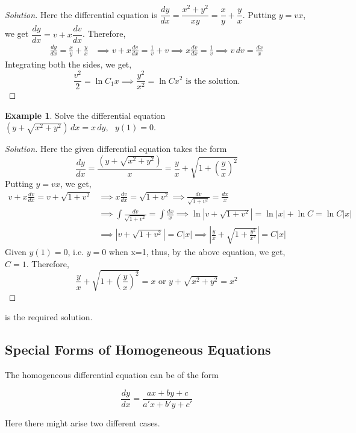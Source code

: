 \documentclass{book}
\theoremstyle{definition}
\newtheorem{example}{Example}[section]
\newenvironment{solution}
    {\begin{proof}[Solution]}
    {\end{proof}}
\begin{document}
\begin{solution}
Here the differential equation is $\dfrac{dy}{dx}=\dfrac{x^2+y^2}{xy}=\dfrac{x}{y}+\dfrac{y}{x}$. Putting $y=vx$, we get $\dfrac{dy}{dx}=v+x\dfrac{dv}{dx}$. Therefore, 
\begin{align*}
\frac{dy}{dx}=\frac{x}{y}+\frac{y}{x} &\implies v+x\frac{dv}{dx}=\frac{1}{v}+v \implies x\frac{dv}{dx}=\frac{1}{v} \implies v\,dv=\frac{dx}{x}
\end{align*}
Integrating both the sides, we get, 
\[
\frac{v^2}{2}=\ln C_1x \implies \frac{y^2}{x^2}=\ln Cx^2 \text{ is the solution.}
\]
\end{solution}

\begin{example}
Solve the differential equation $(y+\sqrt{x^2+y^2})\,dx=x\,dy, \text{ } y(1)=0$.    
\end{example}

\begin{solution}
Here the given differential equation takes the form
\[
\frac{dy}{dx}=\frac{(y+\sqrt{x^2+y^2})}{x}=\frac{y}{x}+\sqrt{1+\left(\frac{y}{x}\right)^2}
\]
Putting $y=vx$, we get,
\begin{align*}
v+x\frac{dv}{dx}=v+\sqrt{1+v^2} &\implies x\frac{dv}{dx}=\sqrt{1+v^2} \implies \frac{dv}{\sqrt{1+v^2}}=\frac{dx}{x} \\
&\implies \int\frac{dv}{\sqrt{1+v^2}}=\int\frac{dx}{x} \implies \ln \left|v+\sqrt{1+v^2}\right|=\ln |x|+\ln C=\ln C|x| \\
&\implies \left|v+\sqrt{1+v^2}\right| =C|x| \implies \left|\frac{y}{x}+\sqrt{1+\frac{y^2}{x^2}}\right|=C|x|
\end{align*}
Given $y(1)=0$, i.e. $y=0$ when x=1, thus, by the above equation, we get, $C=1$. Therefore, 
\[
\frac{y}{x}+\sqrt{1+\left(\frac{y}{x}\right)^2}=x \text{ or } y+\sqrt{x^2+y^2}=x^2
\]
\end{solution}
is the required solution.

\subsection{Special Forms of Homogeneous Equations}

The homogeneous differential equation can be of the form

\[
\frac{dy}{dx}=\frac{ax+by+c}{a'x+b'y+c'}
\]

Here there might arise two different cases.
\end{document}
